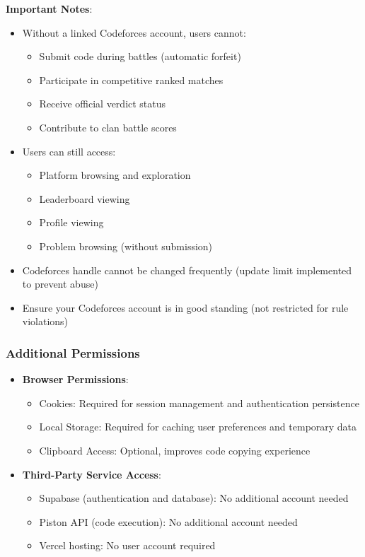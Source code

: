 \documentclass[12pt,a4paper]{article}
\begin{document}
\textbf{Important Notes}:
\begin{itemize}[leftmargin=*]
\item Without a linked Codeforces account, users cannot:
  \begin{itemize}
    \item Submit code during battles (automatic forfeit)
    \item Participate in competitive ranked matches
    \item Receive official verdict status
    \item Contribute to clan battle scores
  \end{itemize}
\item Users can still access:
  \begin{itemize}
    \item Platform browsing and exploration
    \item Leaderboard viewing
    \item Profile viewing
    \item Problem browsing (without submission)
  \end{itemize}
\item Codeforces handle cannot be changed frequently (update limit implemented to prevent abuse)
\item Ensure your Codeforces account is in good standing (not restricted for rule violations)
\end{itemize}

\subsubsection{Additional Permissions}

\begin{itemize}[leftmargin=*]
\item \textbf{Browser Permissions}:
  \begin{itemize}
    \item Cookies: Required for session management and authentication persistence
    \item Local Storage: Required for caching user preferences and temporary data
    \item Clipboard Access: Optional, improves code copying experience
  \end{itemize}
\item \textbf{Third-Party Service Access}:
  \begin{itemize}
    \item Supabase (authentication and database): No additional account needed
    \item Piston API (code execution): No additional account needed
    \item Vercel hosting: No user account required
  \end{itemize}
\end{itemize}
\end{document}
